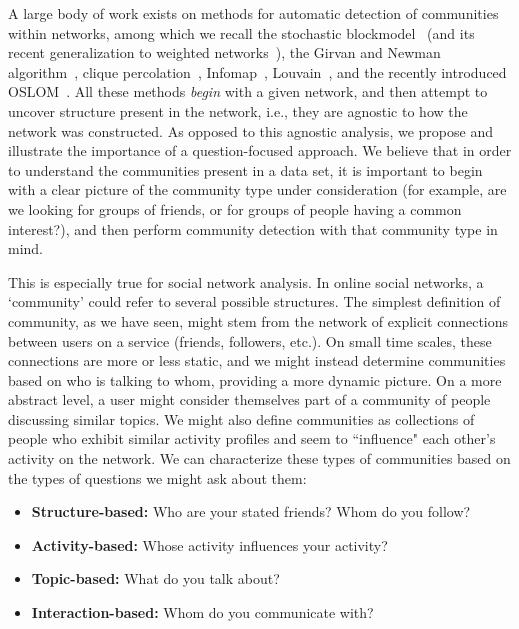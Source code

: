 A large body of work exists on methods for automatic detection of communities within networks, among which we recall the stochastic blockmodel~\cite{Holland1983} (and its recent generalization to weighted networks~\cite{Aicher26062014}), the Girvan and Newman algorithm~\cite{newman2004finding}, clique percolation~\cite{PalEtAl05}, Infomap~\cite{Rosvall08mapsof}, Louvain~\cite{blondel2008fast}, and the recently introduced OSLOM~\cite{LancichinettiPlos}.
All these methods \emph{begin} with a given network, and then attempt to uncover structure present in the network, i.e., they are agnostic to how the network was constructed. As opposed to this agnostic analysis, we propose and illustrate the importance of a question-focused approach. We believe that in order to understand the communities present in a data set, it is important to begin with a clear picture of the community type under consideration (for example, are we looking for groups of friends, or for groups of people having a common interest?), and then perform community detection with that community type in mind. 

This is especially true for social network analysis. In online social networks, a `community' could refer to several possible structures. The simplest definition of community, as we have seen, might stem from the network of explicit connections between users on a service (friends, followers, etc.). On small time scales, these connections are more or less static, and we might instead determine communities based on who is talking to whom, providing a more dynamic picture. On a more abstract level, a user might consider themselves part of a community of people discussing similar topics. We might also define communities as collections of people who exhibit similar activity profiles and seem to ``influence" each other's activity on the network. We can characterize these types of communities based on the types of questions we might ask about them:
\begin{itemize}
	\item \textbf{Structure-based:} Who are your stated friends? Whom do you follow?
	\item \textbf{Activity-based:} Whose activity influences your activity?
	\item \textbf{Topic-based:} What do you talk about?
	\item \textbf{Interaction-based:} Whom do you communicate with?
\end{itemize}

